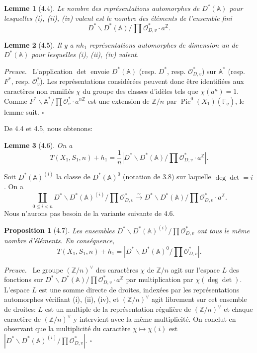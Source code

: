 \documentclass[10pt]{article}
\newcommand{\Fq}{\mathbb F_q}
\newcommand{\Z}{\mathbb Z}
\newcommand{\Adele}{\mathbb A}
\newcommand{\Pic}{\operatorname{Pic}}
\newcommand{\degm}{\operatorname{deg}}
\newcommand{\detm}{\operatorname{det}}
\newcommand{\OO}{\mathcal O}
\theoremstyle{deligne}
\newtheorem*{proposition*}{Proposition}
\newtheorem*{lemma*}{Lemme}
\newenvironment{proofdel}[1][Preuve.]{\textit{#1}\ }{\hfill$\square$}
\begin{document}
\begin{lemma*}[4.4]
Le nombre des représentations automorphes de $D^*(\Adele)$ pour lesquelles (i), (ii), (iv) valent est le nombre des éléments de l'ensemble fini
\begin{equation}\tag{4.4.1}
D^*\backslash D^*(\Adele)/\prod\mathcal O_{D,v}^*\cdot a^\Z.
\end{equation}
\end{lemma*}

\begin{lemma*}[4.5]
Il y a $n h_1$ représentations automorphes de dimension un de $D^*(\Adele)$ pour lesquelles (i), (ii), (iv) valent.
\end{lemma*}

\begin{proofdel}
L'application $\detm$ envoie $D^*(\Adele)$ (resp. $D^*$, resp. $\mathcal O_{D,v}^*$) sur $\Adele^*$ (resp. $F^*$, resp. $\OO_v^*$). Les représentations considérées peuvent donc être identifiées aux caractères non ramifiés $\chi$ du groupe des classes d'id\`eles tels que $\chi(a^n)=1$. Comme $F^*\backslash\Adele^*/\prod\OO_v^*\cdot a^{n\Z}$ est une extension de $\Z/n$ par $\Pic^0(X_1)(\Fq)$, le lemme suit.
\end{proofdel}

De 4.4 et 4.5, nous obtenons:
\begin{lemma*}[4.6]
On a
\[
T(X_1,S_1,n)+h_1=\frac1n\left|D^*\backslash D^*(\Adele)/\prod\mathcal O_{D,v}^*\cdot a^\Z\right|.
\]
\end{lemma*}

Soit $D^*(\Adele)^{(i)}$ la classe de $D^*(\Adele)^0$ (notation de 3.8) sur laquelle $\degm\detm=i$. On a
\[
\coprod_{0\le i<n}D^*\backslash D^*(\Adele)^{(i)}/\prod\mathcal O_{D,v}^*
\xrightarrow{\sim}
D^*\backslash D^*(\Adele)/\prod\mathcal O_{D,v}^*\cdot a^\Z.
\]
Nous n'aurons pas besoin de la variante suivante de 4.6.

\begin{proposition*}[4.7]
Les ensembles $D^*\backslash D^*(\Adele)^{(i)}/\prod\mathcal O_{D,v}^*$ ont tous le même nombre d'éléments. En conséquence,
\[
T(X_1,S_1,n)+h_1=\left|D^*\backslash D^*(\Adele)^0/\prod\mathcal O_{D,v}^*\right|.
\]
\end{proposition*}

\begin{proofdel}
Le groupe $(\Z/n)^\vee$ des caractères $\chi$ de $\Z/n$ agit sur l'espace $L$ des fonctions sur $D^*\backslash D^*(\Adele)/\prod\mathcal O_{D,v}^*\cdot a^\Z$ par multiplication par $\chi(\degm\detm)$. L'espace $L$ est une somme directe de droites, indexées par les représentations automorphes vérifiant (i), (ii), (iv), et $(\Z/n)^\vee$ agit librement sur cet ensemble de droites: $L$ est un multiple de la représentation régulière de $(\Z/n)^\vee$ et chaque caractère de $(\Z/n)^\vee$ y intervient avec la même multiplicité. On conclut en observant que la multiplicité du caractère $\chi\mapsto\chi(i)$ est $|D^*\backslash D^*(\Adele)^{(i)}/\prod\mathcal O_{D,v}^*|$.
\end{proofdel}
\end{document}
